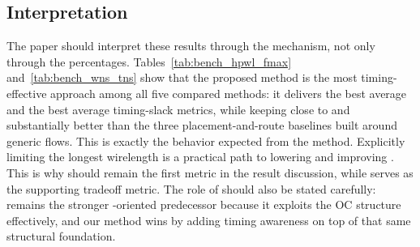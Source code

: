\begin{table}[t]
\caption{Benchmark-wise \wns and \tns comparison for all five methods.}
\label{tab:bench_wns_tns}
\centering
\scriptsize
{}
\end{table}

\subsection{Interpretation}

The paper should interpret these results through the mechanism, not only through the percentages. Tables~\ref{tab:bench_hpwl_fmax} and~\ref{tab:bench_wns_tns} show that the proposed method is the most timing-effective approach among all five compared methods: it delivers the best average \fmax and the best average timing-slack metrics, while keeping \hpwl close to \rsad and substantially better than the three placement-and-route baselines built around generic flows. This is exactly the behavior expected from the method. Explicitly limiting the longest wirelength is a practical path to lowering \wns and improving \fmax. This is why \fmax should remain the first metric in the result discussion, while \hpwl serves as the supporting tradeoff metric. The role of \rsad should also be stated carefully: \rsad remains the stronger \hpwl-oriented predecessor because it exploits the OC structure effectively, and our method wins by adding timing awareness on top of that same structural foundation.

